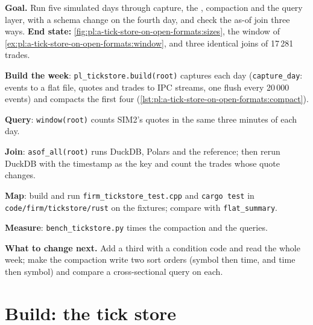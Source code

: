 \begin{tutorial}
\textbf{Goal.} Run five simulated days through capture, the , compaction and the query layer, with a schema change
on the fourth day, and check the as-of join three ways. \textbf{End state:} \cref{fig:pl:a-tick-store-on-open-formats:sizes},
the window of \cref{ex:pl:a-tick-store-on-open-formats:window}, and three identical joins of 17\,281 trades.
\begin{tutsteps}
\item \textbf{Build the week}: \texttt{pl\_tickstore.build(root)} captures each day (\texttt{capture\_day}: events to a flat
file, quotes and trades to IPC streams, one flush every 20\,000 events) and compacts the first four
(\cref{lst:pl:a-tick-store-on-open-formats:compact}).
\item \textbf{Query}: \texttt{window(root)} counts SIM2's quotes in the same three minutes of each day.
\item \textbf{Join}: \texttt{asof\_all(root)} runs DuckDB, Polars and the reference; then rerun DuckDB with the timestamp as the key
and count the trades whose quote changes.
\item \textbf{Map}: build and run \texttt{firm\_tickstore\_test.cpp} and \texttt{cargo test} in \texttt{code/firm/tickstore/rust}
on the fixtures; compare with \texttt{flat\_summary}.
\item \textbf{Measure}: \texttt{bench\_tickstore.py} times the compaction and the queries.
\end{tutsteps}
\textbf{What to change next.} Add a third  with a condition code and read the whole week; make the compaction
write two sort orders (symbol then time, and time then symbol) and compare a cross-sectional query on each.
\end{tutorial}

\section{Build: the tick store}\label{bld:pl:a-tick-store-on-open-formats:tickstore}

